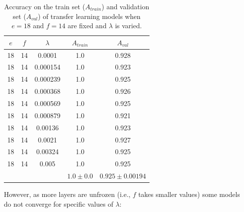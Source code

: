 \begin{table}[ht]
\centering
\begin{tabular}{ |c|c|c|c|c| }
\hline
$e$ & $f$ & $\lambda$ & $A_{train}$ & $A_{val}$ \\
\hline
18 & 14 & 0.0001 & 1.0 & 0.928 \\
18 & 14 & 0.000154 & 1.0 & 0.923 \\
18 & 14 & 0.000239 & 1.0 & 0.925 \\
18 & 14 & 0.000368 & 1.0 & 0.926 \\
18 & 14 & 0.000569 & 1.0 & 0.925 \\
18 & 14 & 0.000879 & 1.0 & 0.921 \\
18 & 14 & 0.00136 & 1.0 & 0.923 \\
18 & 14 & 0.0021 & 1.0 & 0.927 \\
18 & 14 & 0.00324 & 1.0 & 0.925 \\
18 & 14 & 0.005 & 1.0 & 0.925 \\
\hline
 & & & $1.0\pm0.0$ & $0.925\pm0.00194$ \\
\hline
\end{tabular}
\caption{Accuracy on the train set ($A_{train}$) and validation set ($A_{val}$) of transfer learning models when $e = 18$ and $f = 14$ are fixed and $\lambda$ is varied.}
\label{table:vgg16_finetuning_14}
\end{table}

However, as more layers are unfrozen (i.e., $f$ takes smaller values) some models do not converge for specific values of $\lambda$:

